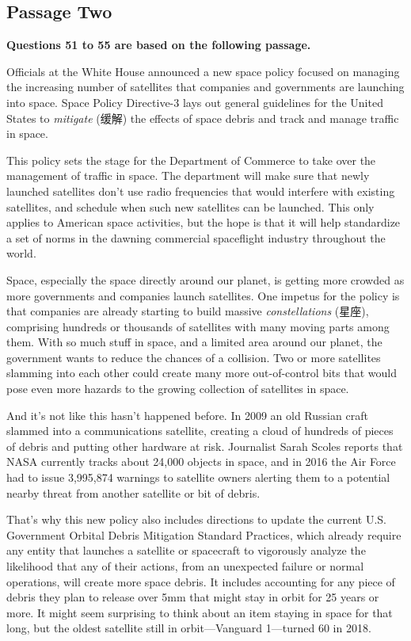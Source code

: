 \documentclass[UTF8,11pt]{ctexart}
\begin{document}
\subsection*{\textbf{Passage Two}}


\textbf{Questions 51 to 55 are based on the following passage.}


Officials at the White House announced a new space policy focused on managing the increasing number of satellites that companies and governments are launching into space. Space Policy Directive-3 lays out general guidelines for the United States to\textit{ mitigate} (缓解) the effects of space debris and track and manage traffic in space.


This policy sets the stage for the Department of Commerce to take over the management of traffic in space. The department will make sure that newly launched satellites don’t use radio frequencies that would interfere with existing satellites, and schedule when such new satellites can be launched. This only applies to American space activities, but the hope is that it will help standardize a set of norms in the dawning commercial spaceflight industry throughout the world.


Space, especially the space directly around our planet, is getting more crowded as more governments and companies launch satellites. One impetus for the policy is that companies are already starting to build massive \textit{constellations} (星座), comprising hundreds or thousands of satellites with many moving parts among them. With so much stuff in space, and a limited area around our planet, the government wants to reduce the chances of a collision. Two or more satellites slamming into each other could create many more out-of-control bits that would pose even more hazards to the growing collection of satellites in space.


And it’s not like this hasn’t happened before. In 2009 an old Russian craft slammed into a communications satellite, creating a cloud of hundreds of pieces of debris and putting other hardware at risk. Journalist Sarah Scoles reports that NASA currently tracks about 24,000 objects in space, and in 2016 the Air Force had to issue 3,995,874 warnings to satellite owners alerting them to a potential nearby threat from another satellite or bit of debris.


That’s why this new policy also includes directions to update the current U.S. Government Orbital Debris Mitigation Standard Practices, which already require any entity that launches a satellite or spacecraft to vigorously analyze the likelihood that any of their actions, from an unexpected failure or normal operations, will create more space debris. It includes accounting for any piece of debris they plan to release over 5mm that might stay in orbit for 25 years or more. It might seem surprising to think about an item staying in space for that long, but the oldest satellite still in orbit—Vanguard 1—turned 60 in 2018.
\end{document}
